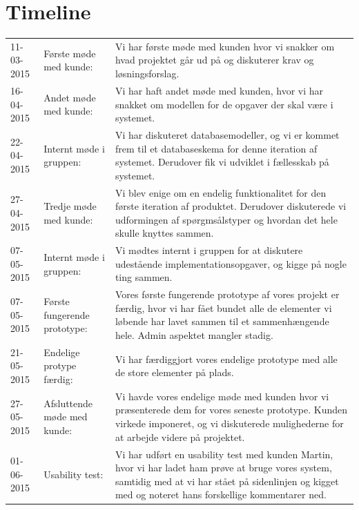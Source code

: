 \documentclass[11pt, a4paper]{article}
\begin{document}
\section{Timeline}
\label{sec:timeline}
\begin{tabular}{l l p{8cm}}
11-03-2015 & Første møde med kunde: & Vi har første møde med kunden hvor vi snakker om hvad projektet går ud på og diskuterer krav og løsningsforslag. \\
16-04-2015 & Andet møde med kunde: & Vi har haft andet møde med kunden, hvor vi har snakket om modellen for de opgaver der skal være i systemet. \\
22-04-2015 & Internt møde i gruppen: & Vi har diskuteret databasemodeller, og vi er kommet frem til et databaseskema for denne iteration af systemet. Derudover fik vi udviklet i fællesskab på systemet. \\
27-04-2015 & Tredje møde med kunde: & Vi blev enige om en endelig funktionalitet for den første iteration af produktet. Derudover diskuterede vi udformingen af spørgmsålstyper og hvordan det hele skulle knyttes sammen. \\
07-05-2015 & Internt møde i gruppen: & Vi mødtes internt i gruppen for at diskutere udestående implementationsopgaver, og kigge på nogle ting sammen. \\
07-05-2015 & Første fungerende prototype: & Vores første fungerende prototype af vores projekt er færdig, hvor vi har fået bundet alle de elementer vi løbende har lavet sammen til et sammenhængende hele. Admin aspektet mangler stadig. \\
21-05-2015 & Endelige protype færdig: & Vi har færdiggjort vores endelige prototype med alle de store elementer på plads. \\
27-05-2015 & Afsluttende møde med kunde: & Vi havde vores endelige møde med kunden hvor vi præsenterede dem for vores seneste prototype. Kunden virkede imponeret, og vi diskuterede mulighederne for at arbejde videre på projektet. \\
01-06-2015 & Usability test: & Vi har udført en usability test med kunden Martin, hvor vi har ladet ham prøve at bruge vores system, samtidig med at vi har stået på sidenlinjen og kigget med og noteret hans forskellige kommentarer ned. \\ 
\end{tabular}

\newpage


{}
\end{document}
